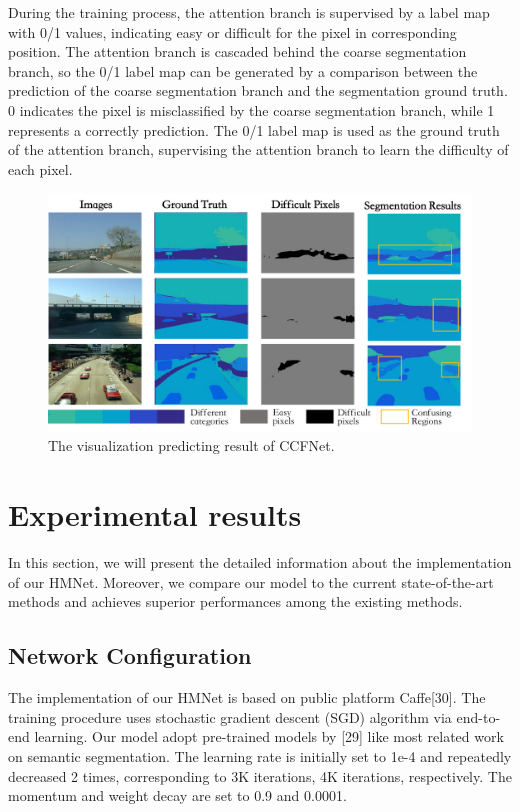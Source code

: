 \documentclass[10.5pt,compsoc]{TsT}
\theoremstyle{mystyle}
\begin{document}
{During the training process, the attention branch is supervised by a label map with 0/1 values, indicating  easy or difficult for the pixel in corresponding position.
The attention branch is cascaded behind the coarse segmentation branch, so the 0/1 label map can be generated by a comparison between the prediction of the coarse segmentation branch and the segmentation ground truth.
0 indicates the pixel is misclassified by the coarse segmentation branch, while 1 represents a correctly prediction.
The 0/1 label map is used as the ground truth of the attention branch, supervising the attention branch to learn the difficulty of each pixel.

\begin{figure}[ht]
\centering
\includegraphics[width=1.9\columnwidth]{fig3.png}
\caption{The visualization predicting result of CCFNet.}
\label{fig:sift}
\end{figure} 

\section{Experimental results}
\label{s:results}
\noindent
In this section, we will present the detailed information about the implementation of our HMNet. Moreover, we compare our model to the current state-of-the-art methods and achieves superior performances among the existing methods.

\subsection{Network Configuration}
\noindent
The implementation of our HMNet is based on public platform Caffe[30]. The training procedure uses stochastic gradient descent (SGD) algorithm via end-to-end learning. Our model adopt pre-trained models by [29] like most related work on semantic segmentation. The learning rate is initially set to 1e-4 and repeatedly decreased 2 times, corresponding to 3K iterations, 4K iterations, respectively. The momentum and weight decay are set to 0.9 and 0.0001.

}
\end{document}
